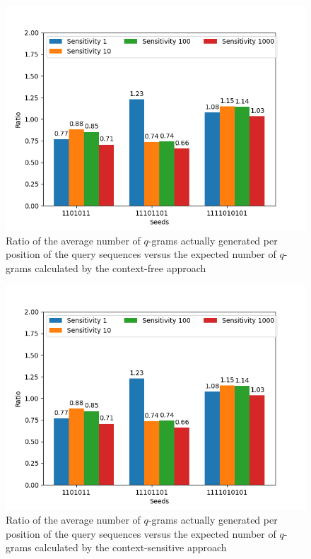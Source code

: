\documentclass[twoside,a4paper,bsc]{master}
\begin{document}
\begin{figure}
\centering
\includegraphics[scale=0.6]{graphics/threshold_contextfree.png}
\caption{Ratio of the average number of \(q\)-grams actually generated per
position of the query sequences versus the expected number of \(q\)-grams
calculated by the context-free approach}
\label{fig:numctxfree}
\end{figure}
\begin{figure}
\centering
\includegraphics[scale=0.6]{graphics/threshold_contextsens.png}
\caption{Ratio of the average number of \(q\)-grams actually generated per
position of the query sequences versus the expected number of \(q\)-grams
calculated by the context-sensitive approach}
\label{fig:numctxsens}
\end{figure}
\end{document}

